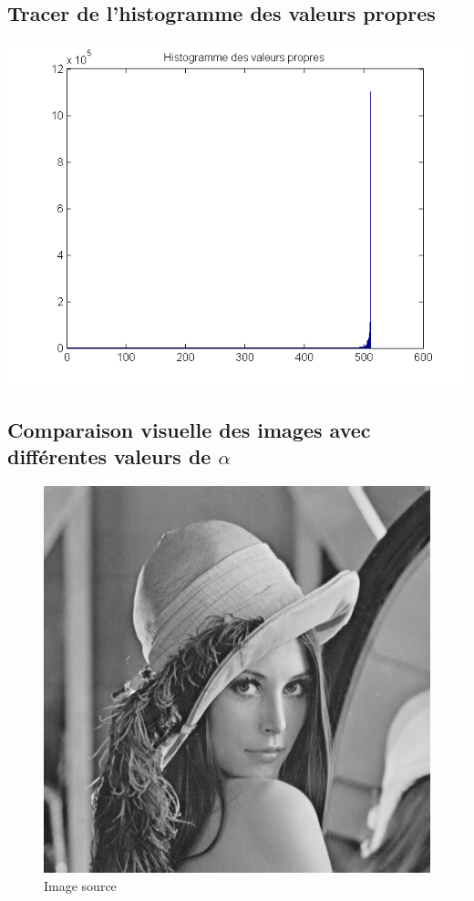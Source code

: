 \documentclass{report}
\begin{document}
		\subsection{Tracer de l’histogramme des valeurs propres}
			\includegraphics[scale=0.7]{sources/Q531.png}

		\subsection{Comparaison visuelle des images avec différentes valeurs de $\alpha$}
			\begin{figure}
			\begin{center}
			\includegraphics[scale=0.7]{sources/lena.jpg}
			\caption{Image source}
			\end{center}
			\end{figure}
\end{document}
